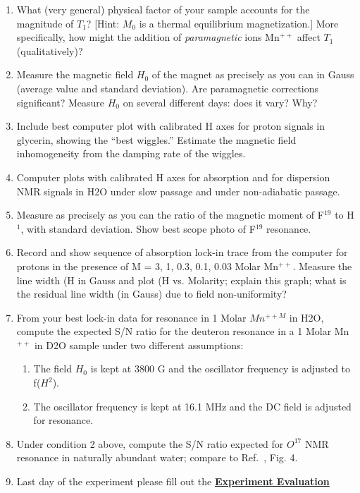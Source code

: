 \documentclass{../lab}
\begin{document}
\begin{enumerate}
\begin{enumerate}
    \end{enumerate}

    \item What (very general) physical factor of your sample accounts for the magnitude of $T_1$? [Hint: $M_0$ is a thermal equilibrium magnetization.] More specifically, how might the addition of \emph{paramagnetic} ions Mn$^{++}$ affect $T_1$ (qualitatively)?

    \item Measure the magnetic field $H_0$ of the magnet as precisely as you can in Gauss (average value and standard deviation). Are paramagnetic corrections significant? Measure $H_0$ on several different days: does it vary? Why?

    \item Include best computer plot with calibrated H axes for proton signals in glycerin, showing the ``best wiggles.'' Estimate the magnetic field inhomogeneity from the damping rate of the wiggles.

    \item Computer plots with calibrated H axes for absorption and for dispersion NMR signals in H2O under slow passage and under non-adiabatic passage.

    \item Measure as precisely as you can the ratio of the magnetic moment of F$^{19}$ to H$^1$, with standard deviation. Show best scope photo of F$^{19}$ resonance.

    \item Record and show sequence of absorption lock-in trace from the computer for protons in the presence of M = 3, 1, 0.3, 0.1, 0.03 Molar Mn$^{++}$. Measure the line width (H in Gauss and plot (H vs. Molarity; explain this graph; what is the residual line width (in Gauss) due to field non-uniformity?

    \item From your best lock-in data for resonance in 1 Molar $Mn^{++M}$ in H2O, compute the expected S/N ratio for the deuteron resonance in a 1 Molar Mn$^{++}$ in D2O sample under two different assumptions:

    \begin{enumerate}
        \item The field $H_0$ is kept at 3800 G and the oscillator frequency is adjusted to f($H^2$).

        \item The oscillator frequency is kept at 16.1 MHz and the DC field is adjusted for resonance.

    \end{enumerate}

    \item Under condition 2 above, compute the S/N ratio expected for $O^{17}$ NMR resonance in naturally abundant water; compare to Ref.~\cite{Ames}, Fig. 4.

    \item Last day of the experiment please fill out the \href{\ExperimentEvaluation}{\textbf{Experiment Evaluation}}
\end{enumerate}
\end{document}
